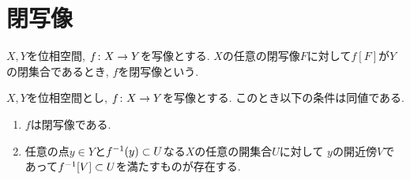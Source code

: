 \documentclass[uplatex, dvipdfmx, a4paper, 12pt, class=jsbook, crop=false]{standalone}
\begin{document}
\section{閉写像}
\label{sec:closed-maps}

\begin{definition}
	$ X, Y $を位相空間, $ f\colon X\to Y $を写像とする.
	$ X $の任意の閉写像$ F $に対して$ f[F] $が$ Y $の閉集合であるとき,
    $ f $を閉写像という.
\end{definition}

\begin{proposition}
    \label{c00001}
    $ X, Y $を位相空間とし, $ f\colon X\to Y $を写像とする.
    このとき以下の条件は同値である.
    \begin{enumerate}
        \item $ f $は閉写像である.
        \item 任意の点$ y \in Y $と$ \mapinvpt{f}{y} \subset U $なる$ X $の任意の開集合$ U $に対して
        $ y $の開近傍$ V $であって$ \mapinvset{f}{V} \subset U $を満たすものが存在する.
    \end{enumerate}
\end{proposition}
\end{document}
